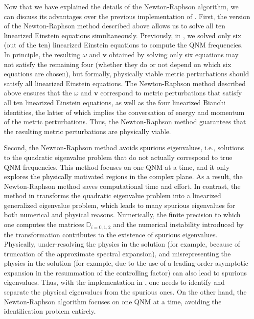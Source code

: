 \documentclass[aps,prx,amsmath,floats,floatfix,twocolumn,
  superscriptaddress,nofootinbib,showpacs]{revtex4-1}
\begin{document}
Now that we have explained the details of the Newton-Raphson algorithm, we can discuss its advantages over the previous implementation of \cite{Chung:2023zdq}.
First, the version of the Newton-Raphson method described above allows us to solve all ten linearized Einstein equations simultaneously.
Previously, in \cite{Chung:2023zdq}, we solved only six (out of the ten) linearized Einstein equations to compute the QNM frequencies. 
In principle, the resulting $\omega$ and $\textbf{v}$ obtained by solving only six equations may not satisfy the remaining four (whether they do or not depend on which six equations are chosen), but formally, physically viable metric perturbations should satisfy all linearized Einstein equations. 
The Newton-Raphson method described above ensures that the $\omega$ and $\textbf{v}$ correspond to metric perturbations that satisfy all ten linearized Einstein equations, as well as the four linearized Bianchi identities, the latter of which implies the conversation of energy and momentum of the metric perturbations. 
Thus, the Newton-Raphson method guarantees that the resulting metric perturbations are physically viable. 

Second, the Newton-Raphson method avoids spurious eigenvalues, i.e., solutions to the quadratic eigenvalue problem that do not actually correspond to true QNM frequencies. 
This method focuses on one QNM at a time, and it only explores the physically motivated regions in the complex plane. As a result, the Newton-Raphson method saves computational time and effort. 
In contrast, the method in \cite{Chung:2023zdq} transforms the quadratic eigenvalue problem into a linearized generalized eigenvalue problem, which leads to many spurious eigenvalues for both numerical and physical reasons. Numerically, the finite precision to which one computes the matrices $\mathbb{D}_{i=0,1,2}$ and the numerical instability introduced by the transformation contributes to the existence of spurious eigenvalues. 
Physically, under-resolving the physics in the solution (for example, because of truncation of the approximate spectral expansion), and misrepresenting the physics in the solution (for example, due to the use of a leading-order asymptotic expansion in the resummation of the controlling factor) can also lead to spurious eigenvalues.
Thus, with the implementation in \cite{Chung:2023zdq}, one needs to identify and separate the physical eigenvalues from the spurious ones. 
On the other hand, the Newton-Raphson algorithm focuses on one QNM at a time, avoiding the identification problem entirely. 
\end{document}
